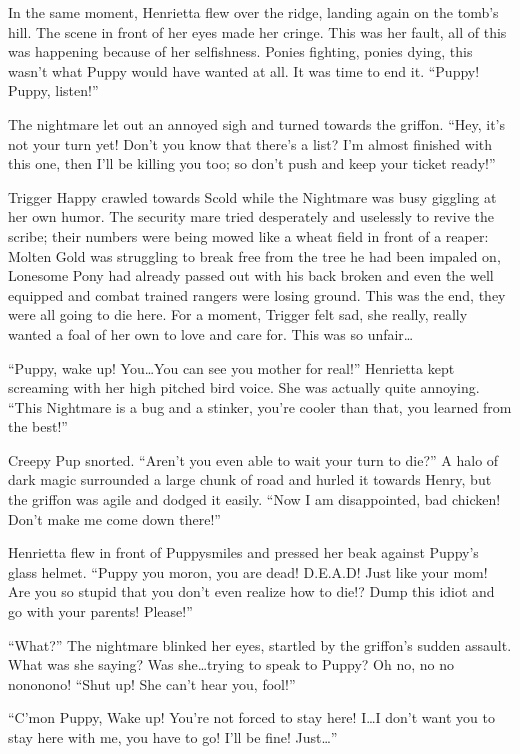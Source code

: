 In the same moment, Henrietta flew over the ridge, landing again on the tomb's hill. The scene in front of her eyes made her cringe. This was her fault, all of this was happening because of her selfishness. Ponies fighting, ponies dying, this wasn't what Puppy would have wanted at all. It was time to end it. ``Puppy! Puppy, listen!''

The nightmare let out an annoyed sigh and turned towards the griffon. ``Hey, it's not your turn yet! Don't you know that there's a list? I'm almost finished with this one, then I'll be killing you too; so don't push and keep your ticket ready!''

Trigger Happy crawled towards Scold while the Nightmare was busy giggling at her own humor. The security mare tried desperately and uselessly to revive the scribe; their numbers were being mowed like a wheat field in front of a reaper: Molten Gold was struggling to break free from the tree he had been impaled on, Lonesome Pony had already passed out with his back broken and even the well equipped and combat trained rangers were losing ground. This was the end, they were all going to die here. For a moment, Trigger felt sad, she really, really wanted a foal of her own to love and care for. This was so unfair\dots

``Puppy, wake up! You\dots You can see you mother for real!'' Henrietta kept screaming with her high pitched bird voice. She was actually quite annoying. ``This Nightmare is a bug and a stinker, you're cooler than that, you learned from the best!''

Creepy Pup snorted. ``Aren't you even able to wait your turn to die?'' A halo of dark magic surrounded a large chunk of road and hurled it towards Henry, but the griffon was agile and dodged it easily. ``Now I am disappointed, bad chicken! Don't make me come down there!''

Henrietta flew in front of Puppysmiles and pressed her beak against Puppy's glass helmet. ``Puppy you moron, you are dead! D.E.A.D! Just like your mom! Are you so stupid that you don't even realize how to die!? Dump this idiot and go with your parents! Please!''

``What?'' The nightmare blinked her eyes, startled by the griffon's sudden assault. What was she saying? Was she\dots trying to speak to Puppy? Oh no, no no nononono! ``Shut up! She can't hear you, fool!''

``C'mon Puppy, Wake up! You're not forced to stay here! I\dots I don't want you to stay here with me, you have to go! I'll be fine! Just\dots''

